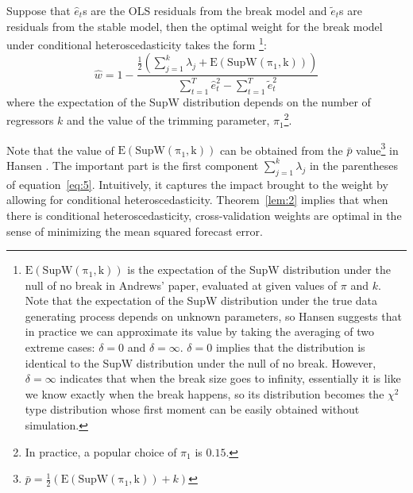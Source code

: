 \begin{theorem} \label{lem:2}
Suppose that $\hat{e}_t$s are the OLS residuals from the break model and $\tilde{e}_t$s are residuals from the stable model, then the optimal weight for the break model under conditional heteroscedasticity takes the form \footnote{$\mathrm{E(SupW(\pi_1,k))}$ is the expectation of the SupW distribution under the null of no break in Andrews' paper, evaluated at given values of $\pi$ and $k$. Note that the expectation of the SupW distribution under the true data generating process depends on unknown parameters, so Hansen suggests that in practice we can approximate its value by taking the averaging of two extreme cases: $\delta = 0$ and $\delta = \infty$. $\delta = 0$ implies that the distribution is identical to the SupW distribution under the null of no break. However, $\delta = \infty$ indicates that when the break size goes to infinity, essentially it is like we know exactly when the break happens, so its distribution becomes the $\chi^2$ type distribution whose first moment can be easily obtained without simulation.}:
\begin{equation} \label{eq:5}
	\hat{w} = 1 - \frac{\frac{1}{2}(\sum_{j=1}^{k}\lambda_j + \mathrm{E(SupW(\pi_1,k))})}{\sum_{t=1}^{T}\hat{e}_t^2 - \sum_{t=1}^{T}\tilde{e}_t^2}
\end{equation}
where the expectation of the SupW distribution depends on the number of regressors $k$ and the value of the trimming parameter, $\pi_1$\footnote{In practice, a popular choice of $\pi_1$ is $0.15$.}.
\end{theorem}
Note that the value of $\mathrm{E(SupW(\pi_1,k))}$ can be obtained from the $\bar{p}$ value\footnote{$\bar{p} = \frac{1}{2}(\mathrm{E(SupW(\pi_1,k))} + k)$} in Hansen \cite{hansen2009averaging}. The important part is the first component $\sum_{j=1}^{k}\lambda_j$ in the parentheses of equation~\ref{eq:5}. Intuitively, it captures the impact brought to the weight by allowing for conditional heteroscedasticity. Theorem~\ref{lem:2} implies that when there is conditional heteroscedasticity, cross-validation weights are optimal in the sense of minimizing the mean squared forecast error.